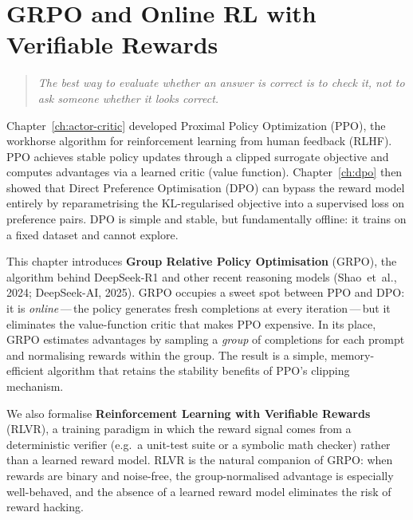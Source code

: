 \chapter[GRPO and Online RL]{GRPO and Online RL with Verifiable Rewards}
\label{ch:grpo}

\begin{quote}
\itshape
The best way to evaluate whether an answer is correct is to check it, not to ask someone whether it looks correct.
\end{quote}

\bigskip

Chapter~\ref{ch:actor-critic} developed Proximal Policy Optimization (PPO), the workhorse algorithm for reinforcement learning from human feedback (RLHF).  PPO achieves stable policy updates through a clipped surrogate objective and computes advantages via a learned critic (value function).  Chapter~\ref{ch:dpo} then showed that Direct Preference Optimisation (DPO) can bypass the reward model entirely by reparametrising the KL-regularised objective into a supervised loss on preference pairs.  DPO is simple and stable, but fundamentally offline: it trains on a fixed dataset and cannot explore.

This chapter introduces \textbf{Group Relative Policy Optimisation} (GRPO), the algorithm behind DeepSeek-R1 and other recent reasoning models (Shao~et~al., 2024; DeepSeek-AI, 2025).  GRPO occupies a sweet spot between PPO and DPO: it is \emph{online}\,---\,the policy generates fresh completions at every iteration\,---\,but it eliminates the value-function critic that makes PPO expensive.  In its place, GRPO estimates advantages by sampling a \emph{group} of completions for each prompt and normalising rewards within the group.  The result is a simple, memory-efficient algorithm that retains the stability benefits of PPO's clipping mechanism.

We also formalise \textbf{Reinforcement Learning with Verifiable Rewards} (RLVR), a training paradigm in which the reward signal comes from a deterministic verifier (e.g.\ a unit-test suite or a symbolic math checker) rather than a learned reward model.  RLVR is the natural companion of GRPO: when rewards are binary and noise-free, the group-normalised advantage is especially well-behaved, and the absence of a learned reward model eliminates the risk of reward hacking.

